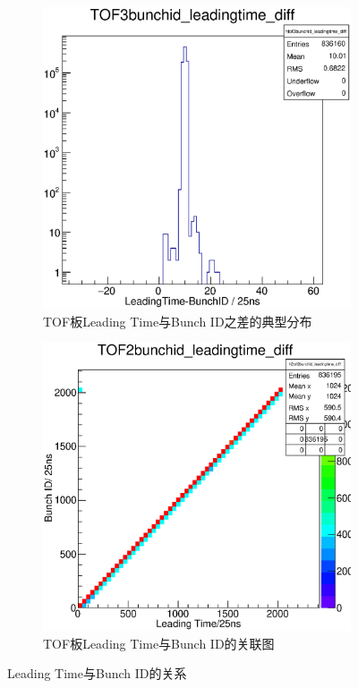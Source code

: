 \begin{figure}[htbp]
	\centering
	\begin{subfigure}[b]{0.48\textwidth}
        \includegraphics[width=\textwidth]{fig/tof_leadingtime_bunchid_diff.eps}
        \caption{TOF板Leading Time与Bunch ID之差的典型分布}
    \end{subfigure}
    \begin{subfigure}[b]{0.48\textwidth}
        \includegraphics[width=\textwidth]{fig/tof_leadingtime_vs_bunchid.eps}
        \caption{TOF板Leading Time与Bunch ID的关联图}
    \end{subfigure}
	\caption{Leading Time与Bunch ID的关系}
	\label{fig:tof_leadingtime_bunchid}
\end{figure}


